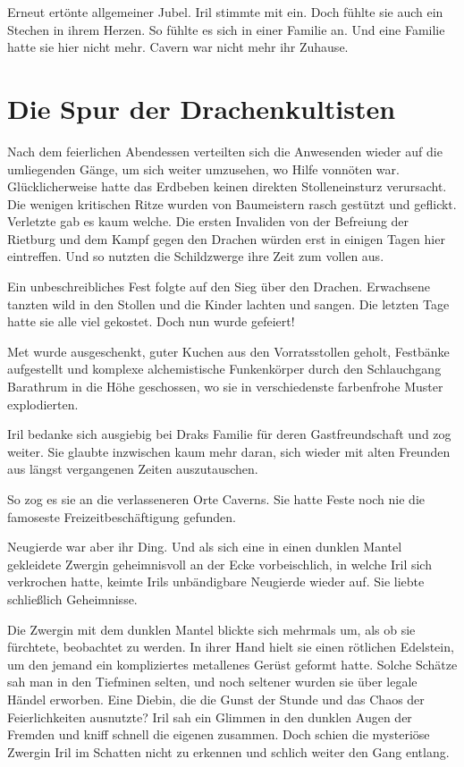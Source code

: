 Erneut ertönte allgemeiner Jubel. Iril stimmte mit ein. Doch fühlte sie auch ein Stechen in ihrem Herzen. So fühlte es sich in einer Familie an. Und eine Familie hatte sie hier nicht mehr. Cavern war nicht mehr ihr Zuhause.






\newpage
\section{Die Spur der Drachenkultisten}

Nach dem feierlichen Abendessen verteilten sich die Anwesenden wieder auf die umliegenden Gänge, um sich weiter umzusehen, wo Hilfe vonnöten war. Glücklicherweise hatte das Erdbeben keinen direkten Stolleneinsturz verursacht. Die wenigen kritischen Ritze wurden von Baumeistern rasch gestützt und geflickt. Verletzte gab es kaum welche. Die ersten Invaliden von der Befreiung der Rietburg und dem Kampf gegen den Drachen würden erst in einigen Tagen hier eintreffen. Und so nutzten die Schildzwerge ihre Zeit zum vollen aus.

Ein unbeschreibliches Fest folgte auf den Sieg über den Drachen. Erwachsene tanzten wild in den Stollen und die Kinder lachten und sangen. Die letzten Tage hatte sie alle viel gekostet. Doch nun wurde gefeiert!

Met wurde ausgeschenkt, guter Kuchen aus den Vorratsstollen geholt, Festbänke aufgestellt und komplexe alchemistische Funkenkörper durch den Schlauchgang Barathrum in die Höhe geschossen, wo sie in verschiedenste farbenfrohe Muster explodierten.

Iril bedanke sich ausgiebig bei Draks Familie für deren Gastfreundschaft und zog weiter. Sie glaubte inzwischen kaum mehr daran, sich wieder mit alten Freunden aus längst vergangenen Zeiten auszutauschen.

So zog es sie an die verlasseneren Orte Caverns. Sie hatte Feste noch nie die famoseste Freizeitbeschäftigung gefunden.

Neugierde war aber ihr Ding. Und als sich eine in einen dunklen Mantel gekleidete Zwergin geheimnisvoll an der Ecke vorbeischlich, in welche Iril sich verkrochen hatte, keimte Irils unbändigbare Neugierde wieder auf. Sie liebte schließlich Geheimnisse.

Die Zwergin mit dem dunklen Mantel blickte sich mehrmals um, als ob sie fürchtete, beobachtet zu werden. In ihrer Hand hielt sie einen rötlichen Edelstein, um den jemand ein kompliziertes metallenes Gerüst geformt hatte. Solche Schätze sah man in den Tiefminen selten, und noch seltener wurden sie über legale Händel erworben. Eine Diebin, die die Gunst der Stunde und das Chaos der Feierlichkeiten ausnutzte? Iril sah ein Glimmen in den dunklen Augen der Fremden und kniff schnell die eigenen zusammen. Doch schien die mysteriöse Zwergin Iril im Schatten nicht zu erkennen und schlich weiter den Gang entlang.

